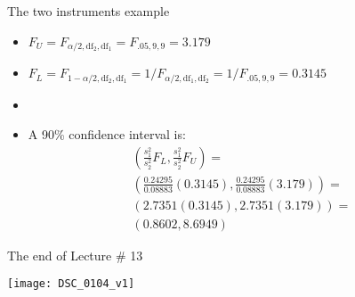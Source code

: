\documentclass[xcolor=dvipsnames]{beamer}
\begin{document}
\begin{frame}{The two instruments example}
	\begin{itemize}
		\item $F_U = F_{\alpha / 2, \text{df}_2, \text{df}_1}=F_{.05, 9, 9}= 3.179$ \pause
		\item $F_L = F_{1-\alpha / 2, \text{df}_2, \text{df}_1} = 1 / F_{\alpha / 2, \text{df}_1, \text{df}_2} = 1 / F_{.05, 9, 9} = 0.3145$ \pause
		\item[]
		\item A 90\% confidence interval is: \pause
		\begin{gather*}
		\left(\frac{s_1^2}{s_2^2} F_L, \frac{s_1^2}{s_2^2} F_U \right)=\\
		 \left(\frac{0.24295}{0.08883} (0.3145), \frac{0.24295}{0.08883} (3.179)\right) =\\
		 \left(2.7351(0.3145), 2.7351 (3.179)\right) = \\
		 (0.8602, 8.6949)
		\end{gather*}
	\end{itemize}
\end{frame}

\begin{frame}{The end of Lecture \# 13}
	\begin{center}
		\texttt{[image: DSC\_0104\_v1]}
	\end{center}
\end{frame}
\end{document}
